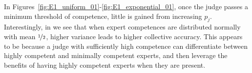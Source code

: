 \documentclass[letterpaper]{article} %
\newcommand{\ben}[1]{\textcolor{red}{Ben says: #1}}
\newcommand{\omer}[1]{\textcolor{purple}{Omer says: #1}}
\newcommand{\nick}[1]{\todo[color=kentuckyblue!40,size=footnotesize]{Nick says: #1}}
\newcommand{\nickin}[1]{\todo[color=kentuckyblue!40,inline]{Nick says: #1}}
\begin{document}
In Figures~\ref{fig:E1_uniform_01}-\ref{fig:E1_exponential_01}, once the judge passes a minimum threshold of competence, little is gained from increasing $p_j$. %
Interestingly, in  we see that when expert competences are distributed normally with mean $\nicefrac{1}{2}$, higher variance leads to higher collective accuracy.
This appears to be because a judge with sufficiently high competence can differentiate between highly competent and minimally competent experts, and then leverage the benefits of having highly competent experts when they are present.
\end{document}
